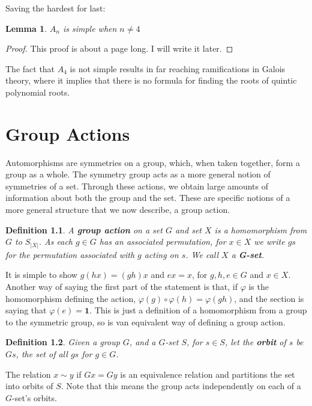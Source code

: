 \documentclass[12pt]{report}
\newtheorem{lemma}[theorem]{Lemma}
\newtheorem{definition}{Definition}
\begin{document}
Saving the hardest for last:

\begin{lemma} $A_n$ is simple when $n \neq 4$ \end{lemma}
\begin{proof}
    This proof is about a page long. I will write it later.
\end{proof}

The fact that $A_4$ is not simple results in far reaching ramifications in Galois theory, where it implies that there is no formula for finding the roots of quintic polynomial roots.

\chapter{Group Actions}

Automorphisms are symmetries on a group, which, when taken together, form a group as a whole. The symmetry group acts as a more general notion of symmetries of a set. Through these actions, we obtain large amounts of information about both the group and the set. These are specific notions of a more general structure that we now describe, a group action.

\begin{definition}
A {\bf group action} on a set $G$ and set $X$ is a homomorphism from $G$ to $S_{|X|}$. As each $g \in G$ has an associated permutation, for $x \in X$ we write $gs$ for the permutation associated with $g$ acting on $s$. We call $X$ a {\bf G-set}.
\end{definition}

It is simple to show $g(hx) = (gh)x$ and $ex = x$, for $g,h,e \in G$ and $x \in X$. Another way of saying the first part of the statement is that, if $\varphi$ is the homomorphism defining the action, $\varphi(g) \circ \varphi(h) = \varphi(gh)$, and the section is saying that $\varphi(e) = \mathbf{1}$. This is just a definition of a homomorphism from a group to the symmetric group, so is van equivalent way of defining a group action.

\begin{definition}
Given a group $G$, and a $G$-set $S$, for $s \in S$, let the {\bf orbit} of $s$ be $Gs$, the set of all $gs$ for $g \in G$.
\end{definition}

The relation $x \sim y$ if $Gx = Gy$ is an equivalence relation and partitions the set into orbits of $S$. Note that this means the group acts independently on each of a $G$-set's orbits.
\end{document}

